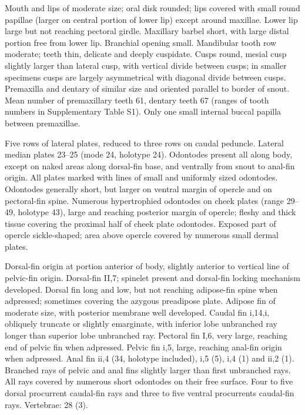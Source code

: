 \documentclass[12pt]{article}
\begin{document}
Mouth and lips of moderate size; oral disk rounded; lips covered with small round papillae (larger on central portion of lower lip) except around maxillae. %
Lower lip large but not reaching pectoral girdle. %
Maxillary barbel short, with large distal portion free from lower lip. %
Branchial opening small. Mandibular tooth row moderate; teeth thin, delicate and deeply cuspidate. %
Cusps round, mesial cusp slightly larger than lateral cusp, with vertical divide between cusps; in smaller specimens cusps are largely asymmetrical with diagonal divide between cusps. %
Premaxilla and dentary of similar size and oriented parallel to border of snout. %
Mean number of premaxillary teeth 61, dentary teeth 67 (ranges of tooth numbers in Supplementary Table S1). %
Only one small internal buccal papilla between premaxillae.

Five rows of lateral plates, reduced to three rows on caudal peduncle. %
Lateral median plates 23--25 (mode 24, holotype 24). %
Odontodes present all along body, except on naked areas along dorsal-fin base, and ventrally from snout to anal-fin origin. %
All plates marked with lines of small and uniformly sized odontodes. %
Odontodes generally short, but larger on ventral margin of opercle and on pectoral-fin spine. %
Numerous hypertrophied odontodes on cheek plates (range 29--49, holotype 43), large and reaching posterior margin of opercle; fleshy and thick tissue covering the proximal half of cheek plate odontodes. %
Exposed part of opercle sickle-shaped; area above opercle covered by numerous small dermal plates.%

Dorsal-fin origin at portion anterior of body, slightly anterior to vertical line of pelvic-fin origin. %
Dorsal-fin II,7; spinelet present and dorsal-fin locking mechanism developed. %
Dorsal fin long and low, but not reaching adipose-fin spine when adpressed; sometimes covering the azygous preadipose plate. %
Adipose fin of moderate size, with posterior membrane well developed. %
Caudal fin i,14,i, obliquely truncate or slightly emarginate, with inferior lobe unbranched ray longer than superior lobe unbranched ray. %
Pectoral fin I,6, very large, reaching end of pelvic fin when adpressed. %
Pelvic fin i,5, large, reaching anal-fin origin when adpressed. %
Anal fin ii,4 (34, holotype included), i,5 (5), i,4 (1) and ii,2 (1). %
Branched rays of pelvic and anal fins slightly larger than first unbranched rays. %
All rays covered by numerous short odontodes on their free surface. %
Four to five dorsal procurrent caudal-fin rays and three to five ventral procurrents caudal-fin rays. Vertebrae: 28 (3).\\%
\bigskip
\end{document}
